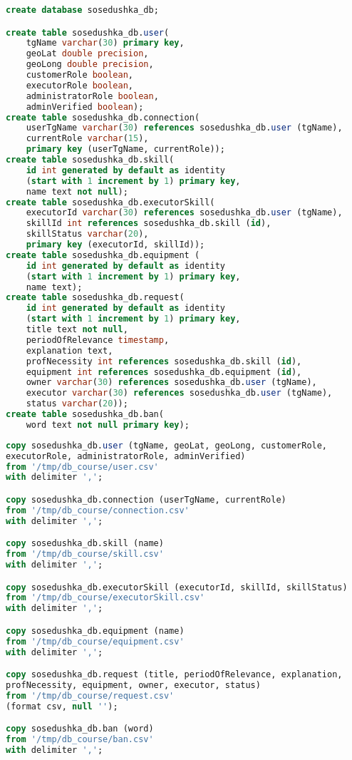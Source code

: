 
\captionsetup{singlelinecheck=false, justification=raggedright}
\begin{lstlisting}[language=sql, caption=Создание базы данных и ее сущностей, label=create]
create database sosedushka_db;

create table sosedushka_db.user(
	tgName varchar(30) primary key,
	geoLat double precision,
	geoLong double precision,
	customerRole boolean, 
	executorRole boolean, 
	administratorRole boolean,
	adminVerified boolean);
create table sosedushka_db.connection(
	userTgName varchar(30) references sosedushka_db.user (tgName),
	currentRole varchar(15),
	primary key (userTgName, currentRole));
create table sosedushka_db.skill(
	id int generated by default as identity 
	(start with 1 increment by 1) primary key,
	name text not null);
create table sosedushka_db.executorSkill(
	executorId varchar(30) references sosedushka_db.user (tgName), 
	skillId int references sosedushka_db.skill (id),
	skillStatus varchar(20),
	primary key (executorId, skillId));
create table sosedushka_db.equipment (
	id int generated by default as identity 
	(start with 1 increment by 1) primary key,
	name text);
create table sosedushka_db.request(
	id int generated by default as identity 
	(start with 1 increment by 1) primary key,
	title text not null,
	periodOfRelevance timestamp,
	explanation text,
	profNecessity int references sosedushka_db.skill (id),
	equipment int references sosedushka_db.equipment (id),
	owner varchar(30) references sosedushka_db.user (tgName),
	executor varchar(30) references sosedushka_db.user (tgName),
	status varchar(20));
create table sosedushka_db.ban(
	word text not null primary key);
\end{lstlisting}
\captionsetup{singlelinecheck=false, justification=centering}\newpage

\captionsetup{singlelinecheck=false, justification=raggedright}
\begin{lstlisting}[language=sql, caption=Заполнение базы данных, label=fill]
copy sosedushka_db.user (tgName, geoLat, geoLong, customerRole, 
executorRole, administratorRole, adminVerified) 
from '/tmp/db_course/user.csv'
with delimiter ',';

copy sosedushka_db.connection (userTgName, currentRole)
from '/tmp/db_course/connection.csv'
with delimiter ',';

copy sosedushka_db.skill (name) 
from '/tmp/db_course/skill.csv'
with delimiter ',';

copy sosedushka_db.executorSkill (executorId, skillId, skillStatus) 
from '/tmp/db_course/executorSkill.csv'
with delimiter ',';

copy sosedushka_db.equipment (name) 
from '/tmp/db_course/equipment.csv'
with delimiter ',';

copy sosedushka_db.request (title, periodOfRelevance, explanation, 	
profNecessity, equipment, owner, executor, status)
from '/tmp/db_course/request.csv'
(format csv, null '');

copy sosedushka_db.ban (word)
from '/tmp/db_course/ban.csv'
with delimiter ',';
\end{lstlisting}
\captionsetup{singlelinecheck=false, justification=centering}